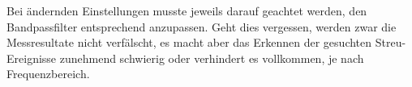 Bei  \"andernden  Einstellungen musste  jeweils  darauf  geachtet werden,  den
Bandpassfilter entsprechend  anzupassen. Geht dies vergessen, werden  zwar die
Messresultate nicht  verf\"alscht, es  macht aber  das Erkennen  der gesuchten
Streu-Ereignisse zunehmend  schwierig oder  verhindert es vollkommen,  je nach
Frequenzbereich.
